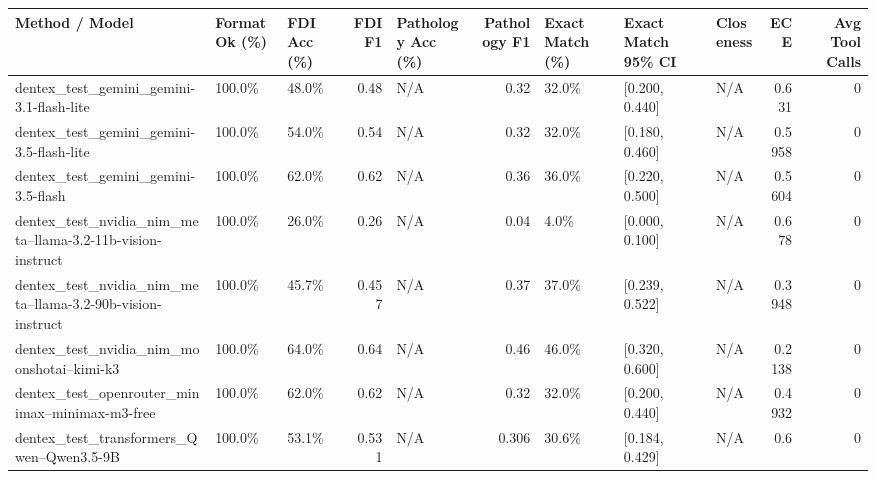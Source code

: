 \begin{tabular}{lllrlrlllrr}
\hline
 Method / Model                                             & Format Ok (\%)   & FDI Acc (\%)   &   FDI F1 & Pathology Acc (\%)   &   Pathology F1 & Exact Match (\%)   & Exact Match 95\% CI   & Closeness   &    ECE &   Avg Tool Calls \\
\hline
 dentex\_test\_gemini\_gemini-3.1-flash-lite                   & 100.0\%          & 48.0\%         &    0.48  & N/A                 &          0.32  & 32.0\%             & [0.200, 0.440]       & N/A         & 0.631  &                0 \\
 dentex\_test\_gemini\_gemini-3.5-flash-lite                   & 100.0\%          & 54.0\%         &    0.54  & N/A                 &          0.32  & 32.0\%             & [0.180, 0.460]       & N/A         & 0.5958 &                0 \\
 dentex\_test\_gemini\_gemini-3.5-flash                        & 100.0\%          & 62.0\%         &    0.62  & N/A                 &          0.36  & 36.0\%             & [0.220, 0.500]       & N/A         & 0.5604 &                0 \\
 dentex\_test\_nvidia\_nim\_meta--llama-3.2-11b-vision-instruct & 100.0\%          & 26.0\%         &    0.26  & N/A                 &          0.04  & 4.0\%              & [0.000, 0.100]       & N/A         & 0.678  &                0 \\
 dentex\_test\_nvidia\_nim\_meta--llama-3.2-90b-vision-instruct & 100.0\%          & 45.7\%         &    0.457 & N/A                 &          0.37  & 37.0\%             & [0.239, 0.522]       & N/A         & 0.3948 &                0 \\
 dentex\_test\_nvidia\_nim\_moonshotai--kimi-k3                 & 100.0\%          & 64.0\%         &    0.64  & N/A                 &          0.46  & 46.0\%             & [0.320, 0.600]       & N/A         & 0.2138 &                0 \\
 dentex\_test\_openrouter\_minimax--minimax-m3-free            & 100.0\%          & 62.0\%         &    0.62  & N/A                 &          0.32  & 32.0\%             & [0.200, 0.440]       & N/A         & 0.4932 &                0 \\
 dentex\_test\_transformers\_Qwen--Qwen3.5-9B                  & 100.0\%          & 53.1\%         &    0.531 & N/A                 &          0.306 & 30.6\%             & [0.184, 0.429]       & N/A         & 0.6    &                0 \\
\hline
\end{tabular}
